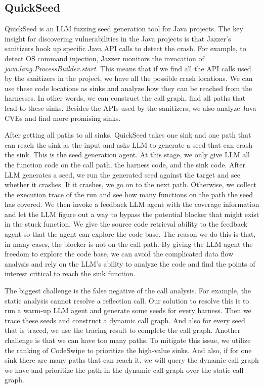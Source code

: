 \subsection{QuickSeed}
\label{quickseed}
QuickSeed is an LLM fuzzing seed generation tool for Java projects.
The key insight for discovering vulnerabilities in the Java projects is that 
Jazzer's sanitizers hook up specific Java API calls to detect the crash.
For example, to detect OS command injection, Jazzer monitors the invocation of \textit{java.lang.ProcessBuilder.start}.
This means that if we find all the API calls used by the sanitizers  in the project, we have all the possible crash locations.
We can use these code locations as sinks and analyze how they can be reached from the harnesses.
In other words, we can construct the call graph, find all paths that lead to these sinks.
Besides the APIs used by the sanitizers, we also analyze Java CVEs and find more promising sinks.

After getting all paths to all sinks, QuickSeed takes one sink and one path that can reach the sink as the input and asks LLM to generate a seed that can crash the sink.
This is the seed generation agent.
At this stage, we only give LLM all the function code on the call path, the harness code, and the sink code.
After LLM generates a seed, we run the generated seed against the target and see whether it crashes.
If it crashes, we go on to the next path.
Otherwise, we collect the execution trace of the run and see how many functions on the path the seed has covered.
We then invoke a feedback LLM agent with the coverage information and let the LLM figure out a way to bypass the potential blocker that might exist in the stuck function.
We give the source code retrieval ability to the feedback agent so that the agent can explore the code base.
The reason we do this is that, in many cases, the blocker is not on the call path.
By giving the LLM agent the freedom to explore the code base, we can avoid the complicated data flow analysis and rely on the LLM's ability to analyze the code and find the points of interest critical to reach the sink function.

The biggest challenge is the false negative of the call analysis. 
For example, the static analysis cannot resolve a reflection call.
Our solution to resolve this is to run a warm-up LLM agent and generate some seeds for every harness.
Then we trace these seeds and construct a dynamic call graph.
And also for every seed that is traced, we use the tracing result to complete the call graph.
Another challenge is that we can have too many paths.
To mitigate this issue, we utilize the ranking of CodeSwipe to prioritize the high-value sinks. 
And also, if for one sink there are many paths that can reach it, we will query the dynamic call graph we have and prioritize the path in the dynamic call graph over the static call graph.